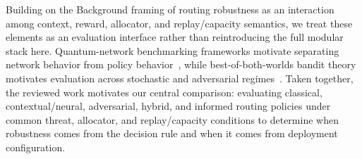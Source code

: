 Building on the Background framing of routing robustness as an interaction among context, reward, allocator, and replay/capacity semantics, we treat these elements as an evaluation interface rather than reintroducing the full modular stack here. Quantum-network benchmarking frameworks motivate separating network behavior from policy behavior~\cite{coopmans2021benchmark,kozlowski2022utility}, while best-of-both-worlds bandit theory motivates evaluation across stochastic and adversarial regimes~\cite{zimmert2019optimal}. Taken together, the reviewed work motivates our central comparison: evaluating classical, contextual/neural, adversarial, hybrid, and informed routing policies under common threat, allocator, and replay/capacity conditions to determine when robustness comes from the decision rule and when it comes from deployment configuration.